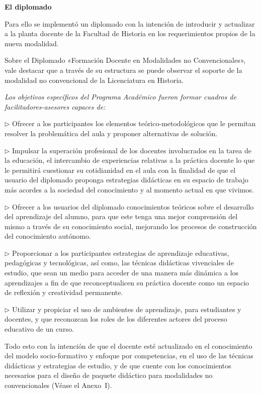 {\bfseries El diplomado}

Para ello se implementó un diplomado con la intención de introducir y 
actualizar a la planta docente de la Facultad de Historia en los 
requerimientos propios de la nueva modalidad.

Sobre el Diplomado «Formación Docente en Modalidades no 
Convencionales», vale destacar que a través de su estructura se puede 
observar el soporte de la modalidad no convencional de la Licenciatura 
en Historia. 

\textsl{Los objetivos específicos del Programa Académico fueron formar 
cuadros de facilitadores-asesores capaces de:}

\begin{Obs} 
\item[$\rhd$] Ofrecer a los participantes los 
elementos teórico-metodológicos que le permitan resolver la 
problemática del aula y proponer alternativas de solución. 
\item[$\rhd$] Impulsar la superación profesional de los docentes involucrados en la 
tarea de la educación, el intercambio de experiencias relativas a la 
práctica docente lo que le permitirá cuestionar su cotidianidad en el aula 
con la finalidad de que el usuario del diplomado proponga estrategias 
didácticas en su espacio de trabajo más acordes a la sociedad del 
conocimiento y al momento actual en que vivimos. 
\item[$\rhd$] Ofrecer a los 
usuarios del diplomado conocimientos teóricos sobre el desarrollo del 
aprendizaje del alumno, para que este tenga una mejor comprensión del 
mismo a través de su conocimiento social, mejorando los procesos de 
construcción del conocimiento autónomo. 
\item[$\rhd$] Proporcionar a los 
participantes estrategias de aprendizaje educativas, pedagógicas y 
tecnológicas, así como, las técnicas didácticas vivenciales de estudio, 
que sean un medio para acceder de una manera más dinámica a los 
aprendizajes a fin de que reconceptualicen su práctica docente como un 
espacio de reflexión y creatividad permanente. 
\item[$\rhd$] Utilizar y 
propiciar el uso de ambientes de aprendizaje, para estudiantes y 
docentes, y que  reconozcan  los roles de los diferentes actores del 
proceso educativo de un curso. 
\end{Obs}

Todo esto con la intención de que el docente esté actualizado 
en el conocimiento del modelo socio-formativo y enfoque por 
competencias, en el uso de las técnicas didácticas y estrategias de 
estudio, y de que cuente con los conocimientos necesarios para el 
diseño de paquete didáctico para modalidades no convencionales 
(Véase el Anexo~I).

